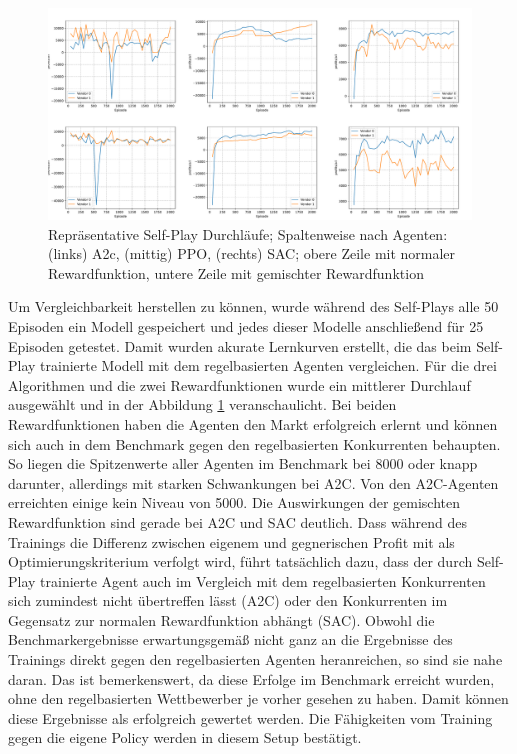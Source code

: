 \begin{figure}[htbp]
	\centering
	\includegraphics[width=\textwidth]{main/self_play_detailed.pdf}
	\caption{Repräsentative Self-Play Durchläufe; Spaltenweise nach Agenten: (links) A2c, (mittig) PPO, (rechts) SAC; obere Zeile mit normaler Rewardfunktion, untere Zeile mit gemischter Rewardfunktion}
	\label{graphic:SelfPlayDetails}
\end{figure}
Um Vergleichbarkeit herstellen zu können, wurde während des Self-Plays alle 50 Episoden ein Modell gespeichert und jedes dieser Modelle anschließend für 25 Episoden getestet.
Damit wurden akurate Lernkurven erstellt, die das beim Self-Play trainierte Modell mit dem regelbasierten Agenten vergleichen.
Für die drei Algorithmen und die zwei Rewardfunktionen wurde ein mittlerer Durchlauf ausgewählt und in der Abbildung \ref{graphic:SelfPlayDetails} veranschaulicht.
Bei beiden Rewardfunktionen haben die Agenten den Markt erfolgreich erlernt und können sich auch in dem Benchmark gegen den regelbasierten Konkurrenten behaupten.
So liegen die Spitzenwerte aller Agenten im Benchmark bei 8000 oder knapp darunter, allerdings mit starken Schwankungen bei A2C.
Von den A2C-Agenten erreichten einige kein Niveau von 5000.
Die Auswirkungen der gemischten Rewardfunktion sind gerade bei A2C und SAC deutlich.
Dass während des Trainings die Differenz zwischen eigenem und gegnerischen Profit mit als Optimierungskriterium verfolgt wird, führt tatsächlich dazu, dass der durch Self-Play trainierte Agent auch im Vergleich mit dem regelbasierten Konkurrenten sich zumindest nicht übertreffen lässt (A2C) oder den Konkurrenten im Gegensatz zur normalen Rewardfunktion abhängt (SAC).
Obwohl die Benchmarkergebnisse erwartungsgemäß nicht ganz an die Ergebnisse des Trainings direkt gegen den regelbasierten Agenten heranreichen, so sind sie nahe daran.
Das ist bemerkenswert, da diese Erfolge im Benchmark erreicht wurden, ohne den regelbasierten Wettbewerber je vorher gesehen zu haben.
Damit können diese Ergebnisse als erfolgreich gewertet werden.
Die Fähigkeiten vom Training gegen die eigene Policy werden in diesem Setup bestätigt.

